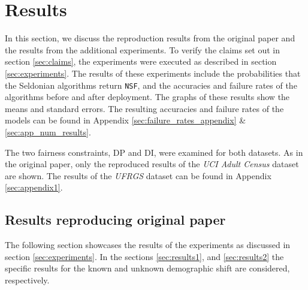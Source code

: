 \section{Results} 
\label{sec:results}
In this section, we discuss the reproduction results from the original paper and the results from the additional experiments. To verify the claims set out in section \ref{sec:claims}, the experiments were executed as described in section \ref{sec:experiments}. The results of these experiments include the probabilities that the Seldonian algorithms return \texttt{NSF}, and the accuracies and failure rates of the algorithms before and after deployment.
The graphs of these results show the means and standard errors. The resulting accuracies and failure rates of the models can be found in Appendix \ref{sec:failure_rates_appendix} \& \ref{sec:app_num_results}.

The two fairness constraints, DP and DI, were examined for both datasets. As in the original paper, only the reproduced results of the \textit{UCI Adult Census} dataset are shown. The results of the \textit{UFRGS} dataset can be found in Appendix \ref{sec:appendix1}.


\subsection{Results reproducing original paper} \label{sec:originalresults}
 
The following section showcases the results of the experiments as discussed in section \ref{sec:experiments}. In the sections \ref{sec:results1}, and \ref{sec:results2} the specific results for the known and unknown demographic shift are considered, respectively. %


